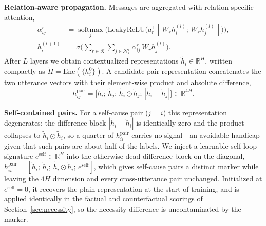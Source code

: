 \documentclass[journal]{IEEEtran}
\newcommand{\Real}{\mathbb{R}}
\newcommand{\Enc}{\mathrm{Enc}}
\begin{document}
\noindent\textbf{Relation-aware propagation.} Messages are aggregated with
relation-specific attention,
\begin{align}
\alpha_{ij}^{r}&=\operatorname*{softmax}_{j}\!\Big(\mathrm{LeakyReLU}\big(a_r^{\top}[\,W_r h_i^{(l)};\,W_r h_j^{(l)}\,]\big)\Big),\\
h_i^{(l+1)}&=\sigma\!\Big(\textstyle\sum_{r\in\mathcal{R}}\sum_{j\in\mathcal{N}_i^{r}}\alpha_{ij}^{r}\,W_r h_j^{(l)}\Big).
\end{align}
After $L$ layers we obtain contextualized representations $\tilde h_i\in\Real^{H}$, written
compactly as $\tilde H=\Enc(\{h_i^{0}\})$. A candidate-pair representation concatenates the
two utterance vectors with their element-wise product and absolute difference,
\begin{equation}
h_{ij}^{\mathrm{pair}}=\big[\tilde h_i;\,\tilde h_j;\,\tilde h_i\odot\tilde h_j;\,|\tilde h_i-\tilde h_j|\big]\in\Real^{4H}.
\label{eq:pair}
\end{equation}

\noindent\textbf{Self-contained pairs.} For a self-cause pair ($j=i$) this representation
degenerates: the difference block $|\tilde h_i-\tilde h_i|$ is identically zero and the
product collapses to $\tilde h_i\odot\tilde h_i$, so a quarter of $h_{ii}^{\mathrm{pair}}$
carries no signal---an avoidable handicap given that such pairs are about half of the
labels. We inject a learnable self-loop signature $e^{\mathrm{self}}\in\Real^{H}$ into the
otherwise-dead difference block on the diagonal,
$h_{ii}^{\mathrm{pair}}=[\tilde h_i;\,\tilde h_i;\,\tilde h_i\odot\tilde h_i;\,e^{\mathrm{self}}]$,
which gives self-cause pairs a distinct marker while leaving the $4H$ dimension and every
cross-utterance pair unchanged. Initialized at $e^{\mathrm{self}}=0$, it recovers the plain
representation at the start of training, and is applied identically in the factual and
counterfactual scorings of Section~\ref{sec:necessity}, so the necessity difference is
uncontaminated by the marker.
\end{document}
